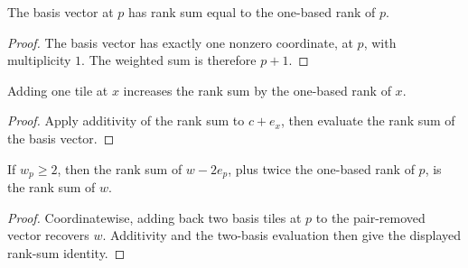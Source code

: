 \begin{lemma}

  \label{lem:rankSum_basis}
  The basis vector at \(p\) has rank sum equal to the one-based rank of
  \(p\).
\end{lemma}
\begin{proof}

\leanok
  The basis vector has exactly one nonzero coordinate, at \(p\), with
  multiplicity \(1\).  The weighted sum is therefore \(p+1\).
\end{proof}

\begin{lemma}

  \label{lem:rankSum_add_basis}
  Adding one tile at \(x\) increases the rank sum by the one-based rank
  of \(x\).
\end{lemma}
\begin{proof}

\leanok
  Apply additivity of the rank sum to \(c+e_x\), then evaluate the rank
  sum of the basis vector.
\end{proof}

\begin{lemma}

  \label{lem:removePair_rankSum_add_pair}
  If \(w_p\geq2\), then the rank sum of \(w-2e_p\), plus twice the
  one-based rank of \(p\), is the rank sum of \(w\).
\end{lemma}
\begin{proof}

\leanok
  Coordinatewise, adding back two basis tiles at \(p\) to the pair-removed
  vector recovers \(w\).  Additivity and the two-basis evaluation then
  give the displayed rank-sum identity.
\end{proof}

